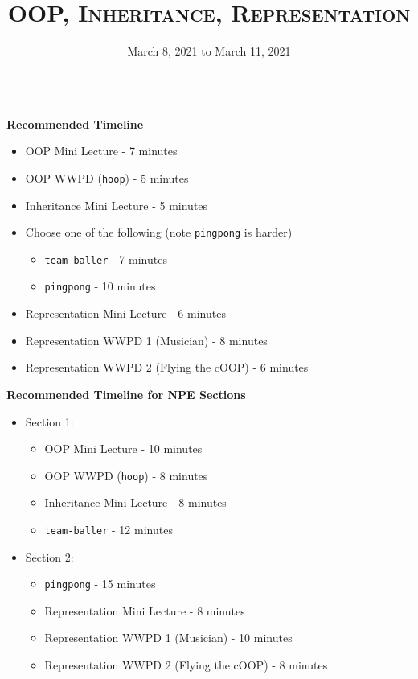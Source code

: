 \documentclass{exam}
\title{\textsc{OOP, Inheritance, Representation}}
\date{March 8, 2021 to March 11, 2021}
\begin{document}
\maketitle
\rule{\textwidth}{0.15em}
\fontsize{12}{15}\selectfont


\begin{guide}
    \textbf{Recommended Timeline}
    \begin{itemize}
        \item OOP Mini Lecture - 7 minutes
        \item OOP WWPD (\lstinline{hoop}) - 5 minutes
        \item Inheritance Mini Lecture - 5 minutes
        \item Choose one of the following (note \lstinline{pingpong} is harder)
            \begin{itemize}
                \item \lstinline{team-baller} - 7 minutes
                \item \lstinline{pingpong} - 10 minutes
            \end{itemize}
        \item Representation Mini Lecture - 6 minutes
        \item Representation WWPD 1 (Musician) - 8 minutes
        \item Representation WWPD 2 (Flying the cOOP) - 6 minutes
    \end{itemize}
    \vspace{.5cm}
    \textbf{Recommended Timeline for NPE Sections}
    \begin{itemize}
        \item Section 1:
            \begin{itemize}
                \item OOP Mini Lecture - 10 minutes
                \item OOP WWPD (\lstinline{hoop}) - 8 minutes
                \item Inheritance Mini Lecture - 8 minutes
                \item \lstinline{team-baller} - 12 minutes
            \end{itemize}
        \item Section 2:
            \begin{itemize}
                \item \lstinline{pingpong} - 15 minutes
                \item Representation Mini Lecture - 8 minutes
                \item Representation WWPD 1 (Musician) - 10 minutes
                \item Representation WWPD 2 (Flying the cOOP) - 8 minutes
            \end{itemize}
    \end{itemize}
\end{guide}
\end{document}
